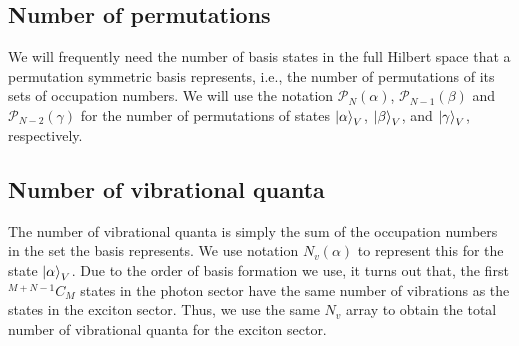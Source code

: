 \documentclass[final,twocolumn]{elsarticle}
\newcommand{\cntset}{\mathcal{P}_N}
\newcommand{\cntsetx}{\mathcal{P}_{N-1}}
\newcommand{\cntsetxx}{\mathcal{P}_{N-2}}
\begin{document}
\begin{small}

\subsection{Number of permutations}

We will frequently need the number of basis states 
in the full Hilbert space that a permutation symmetric basis
represents, i.e., the number of permutations of its sets of occupation numbers.
We will use the notation
$\cntset(\alpha)$, $\cntsetx(\beta)$ and $\cntsetxx(\gamma)$ for 
the number of permutations of states
$\ket{\alpha}_V$, $\ket{\beta}_V$, and $\ket{\gamma}_V$,
respectively.

\subsection{Number of vibrational quanta}
The number of vibrational quanta is simply the sum of the occupation numbers in the set the basis represents.
We use notation $N_v(\alpha)$ to represent this for the state 
$\ket{\alpha}_V$.
Due to the order of basis formation we use,
it turns out that, the first 
${}^{M+N-1}C_{M}$ states in the photon sector
have the same number of vibrations as the states in the exciton sector. Thus, we use the same $N_v$ array to obtain
the total number of vibrational quanta for the exciton sector.







\end{small}
\end{document}
